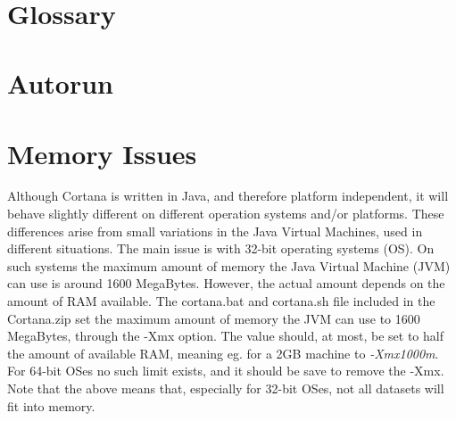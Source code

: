 \documentclass{article}
\begin{document}
\vfill~
\clearpage

\section{Glossary}
\vspace{-10mm}
\renewcommand*{\glossaryname}{}
\printglossaries

\section{Autorun}

\section{Memory Issues}
\label{sec:memory}

Although Cortana is written in Java, and therefore platform independent, it will behave slightly different on different operation systems and/or platforms.
These differences arise from small variations in the Java Virtual Machines, used in different situations.
The main issue is with 32-bit operating systems (OS).
On such systems the maximum amount of memory the Java Virtual Machine (JVM) can use is around 1600 MegaBytes.
However, the actual amount depends on the amount of RAM available.
The cortana.bat and cortana.sh file included in the Cortana.zip set the maximum amount of memory the JVM can use to 1600 MegaBytes, through the -Xmx option.
The value should, at most, be set to half the amount of available RAM, meaning eg. for a 2GB machine to \emph{-Xmx1000m}.
For 64-bit OSes no such limit exists, and it should be save to remove the -Xmx.
Note that the above means that, especially for 32-bit OSes, not all datasets will fit into memory.
\end{document}
